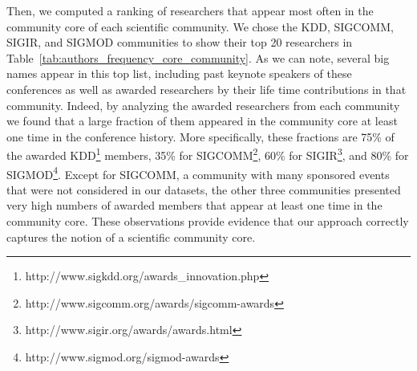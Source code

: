 Then, we computed a ranking of researchers that appear most often in the community core of each scientific community. We chose the KDD, SIGCOMM, SIGIR, and SIGMOD communities to
show their top 20 researchers in Table~\ref{tab:authors_frequency_core_community}.  As we can note, several big names appear in this top list, including past keynote speakers of
these conferences as well as awarded researchers by their life time contributions in that community. Indeed, by analyzing the awarded researchers from each community we found that
a large fraction of them appeared in the community core at least one time in the conference history. More specifically, these fractions are 75\% of the awarded
KDD\footnote{http://www.sigkdd.org/awards\_innovation.php} members, 35\% for SIGCOMM\footnote{http://www.sigcomm.org/awards/sigcomm-awards}, 60\% for
SIGIR\footnote{http://www.sigir.org/awards/awards.html}, and 80\% for SIGMOD\footnote{http://www.sigmod.org/sigmod-awards}.  Except for SIGCOMM, a community with many sponsored
events that were not considered in our datasets, the other three communities presented very high numbers of awarded members that appear at least one time in the community core. These
observations provide evidence that our approach correctly captures the notion of a scientific community core.








